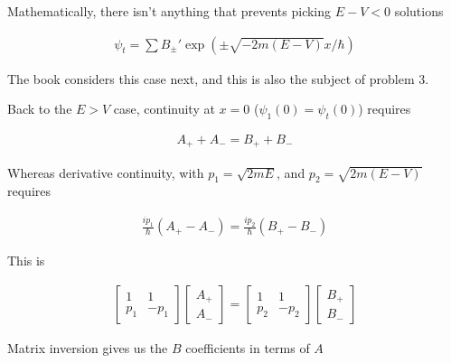 \documentclass{article}
\begin{document}
Mathematically, there isn't anything that prevents picking $E-V <0$ solutions

\begin{align*}
\psi_t = \sum B_{\pm}' \exp\left( \pm \sqrt{-2m(E-V)} x / \hbar \right)
\end{align*}

The book considers this case next, and this is also the subject of 
problem 3.

Back to the $E>V$ case, continuity at $x=0$ ($\psi_1(0) = \psi_t(0)$) requires

\begin{align*}
A_{+} + A_{-} = B_{+} + B_{-}
\end{align*}

Whereas derivative continuity, with $p_1 = \sqrt{2mE}$, and $p_2 = \sqrt{2m (E-V)}$ requires

\begin{align*}
\frac{i p_1}{\hbar} (A_{+} - A_{-}) = \frac{i p_2}{\hbar} (B_{+} - B_{-})
\end{align*}

This is

\begin{align*}
\begin{bmatrix}
1 & 1 \\
p_1 & -p_1
\end{bmatrix}
\begin{bmatrix}
A_{+} \\
A_{-}
\end{bmatrix}
=
\begin{bmatrix}
1 & 1 \\
p_2 & -p_2
\end{bmatrix}
\begin{bmatrix}
B_{+} \\
B_{-}
\end{bmatrix}
\end{align*}

Matrix inversion gives us the $B$ coefficients in terms of $A$
\end{document}
